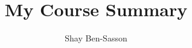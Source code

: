\documentclass{article}
\title{My Course Summary}
\author{Shay Ben-Sasson}
\begin{document}
    \small
    
    
    
\end{document}
